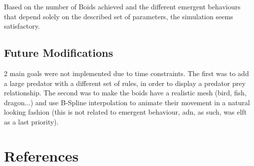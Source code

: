 \documentclass[12pt]{article}
\begin{document}
Based on the number of Boids achieved and the different emergent behaviours that depend solely on the described set of parameters, the simulation seems satisfactory.

\subsection*{Future Modifications}
2 main goals were not implemented due to time constraints. The first was to add a large predator with a different set of rules, in order to display a predator prey relationship. The second was to make the boids have a realistic mesh (bird, fish, dragon...) and use B-Spline interpolation to animate their movement in a natural looking fashion (this is not related to emergent behaviour, adn, as such, was elft as a last priority).

\section{References}
\end{document}

